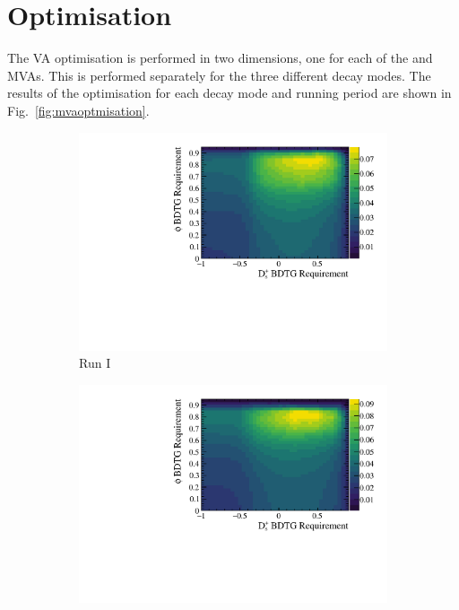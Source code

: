 \section{Optimisation}
\label{sec:app_mva_optimisation}
The VA optimisation is performed in two dimensions, one for each of the \phiz and \Dsp MVAs. This is performed separately for the three different \Dsp decay modes. The results of the optimisation for each \Dsp decay mode and running period are shown in Fig.~\ref{fig:mvaoptmisation}. 
\begin{figure}[!h]
   \centering
   \begin{subfigure}[t]{0.4\textwidth}
      \centering
      \includegraphics[width=1.0\textwidth]{figs/Selection/Ds2KKPi_BDTG_punzi_Run1_cont.pdf}
      \caption{Run I \decay{\Dsp}{\Kp\Km\pip}}
   \end{subfigure}
   \begin{subfigure}[t]{0.4\textwidth}
      \centering
      \includegraphics[width=1.0\textwidth]{figs/Selection/Ds2KKPi_BDTG_punzi_Run2_cont.pdf}

\end{subfigure}
\end{figure}
